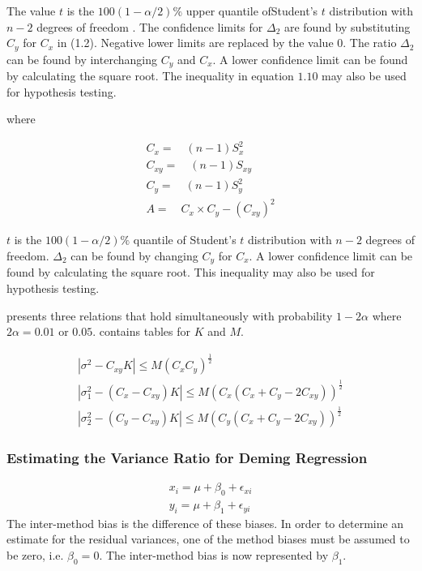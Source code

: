 \documentclass[12pt, a4paper]{report}
\theoremstyle{plain}
\theoremstyle{definition}
\theoremstyle{remark}
\begin{document}
	The value $t$ is the $100(1-\alpha/2)\%$ upper quantile ofStudent's $t$ distribution with $n-2$ degrees of freedom \citep{Kinsella}. The confidence limits for $\Delta_{2}$ are found by substituting $C_{y}$ for $C_{x}$ in (1.2).
	Negative lower limits are replaced by the value $0$. The ratio $\Delta_{2}$
	can be found by interchanging $C_{y}$ and $C_{x}$. A lower confidence limit can be found by calculating the square root. The inequality in equation $1.10$ may also be used for hypothesis testing.
	
	
	where
	
	\begin{eqnarray}
	C_{x}=\quad(n-1)S^2_{x}\nonumber\\
	C_{xy}=\quad(n-1)S_{xy}\nonumber\\
	C_{y}=\quad(n-1)S^2_{y}\nonumber\\
	A=\quad C_{x}\times C_{y} - (C_{xy})^2 \nonumber
	\end{eqnarray}
	
	$t$ is the $100(1-\alpha/2)\%$ quantile of Student's $t$
	distribution with $n-2$ degrees of freedom. $\Delta_{2}$ can be
	found by changing $C_{y}$ for $C_{x}$. A lower confidence limit
	can be found by calculating the square root. This inequality may
	also be used for hypothesis testing.
	
	\citet{Thompson} presents three relations that hold simultaneously
	with probability $1-2\alpha$ where $2\alpha=0.01$ or $0.05$. \citet{Thompson} contains tables for $K$ and $M$.
	
	\begin{eqnarray}
	|\sigma^2-C_{xy}K|\leqslant M(C_{x}C_{y})^{\frac{1}{2}}\\
	|\sigma^2_{1}-(C_{x}-C_{xy})K|\leqslant M(C_{x}(C_{x}+C_{y}-2C_{xy}))^{\frac{1}{2}}\nonumber\\
	|\sigma^2_{2}-(C_{y}-C_{xy})K|\leqslant
	M(C_{y}(C_{x}+C_{y}-2C_{xy}))^{\frac{1}{2}}\nonumber
	\end{eqnarray}	
	
	
	
	
	
	
	


\subsubsection{Estimating the Variance Ratio for Deming Regression}

\begin{eqnarray*}
	x_{i} = \mu +  \beta_{0} + \epsilon_{xi}\\
	y_{i} = \mu +  \beta_{1} + \epsilon_{yi}
\end{eqnarray*}
The inter-method bias is the difference of these biases. In order to determine an estimate for the residual variances, one of the method biases must be assumed to be zero, i.e. $\beta_{0} = 0$. The inter-method bias is now represented by $\beta_{1}$.
\end{document}
